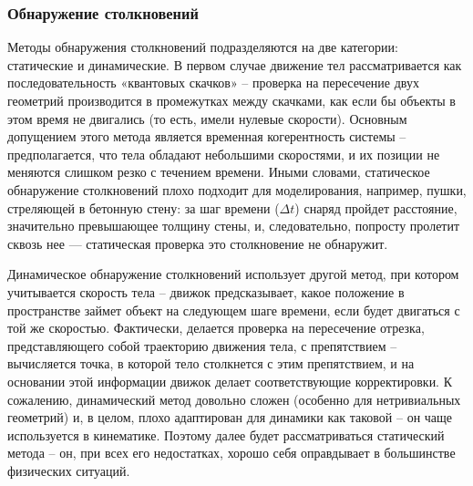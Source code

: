 \subsubsection{Обнаружение столкновений}
Методы обнаружения столкновений подразделяются на две категории: статические и динамические. В первом случае
движение тел рассматривается как последовательность «квантовых скачков» – проверка на пересечение двух геометрий
производится в промежутках между скачками, как если бы объекты в этом время не двигались (то есть, имели нулевые
скорости). Основным допущением этого метода является временная когерентность системы – предполагается, что тела
обладают небольшими скоростями, и их позиции не меняются слишком резко с течением времени. Иными словами,
статическое обнаружение столкновений плохо подходит для моделирования, например, пушки, стреляющей в бетонную
стену: за шаг времени ($\Delta{t}$) снаряд пройдет расстояние, значительно превышающее толщину стены, и, следовательно,
попросту пролетит сквозь нее --- статическая проверка это столкновение не обнаружит.

Динамическое обнаружение столкновений использует другой метод, при котором учитывается скорость тела – движок
предсказывает, какое положение в пространстве займет объект на следующем шаге времени, если будет двигаться с той же
скоростью. Фактически, делается проверка на пересечение отрезка, представляющего собой траекторию движения тела, с
препятствием – вычисляется точка, в которой тело столкнется с этим препятствием, и на основании этой информации движок
делает соответствующие корректировки. К сожалению, динамический метод довольно сложен (особенно для
нетривиальных геометрий) и, в целом, плохо адаптирован для динамики как таковой – он чаще используется в кинематике.
Поэтому далее будет рассматриваться статический метода – он, при всех его недостатках, хорошо себя оправдывает в
большинстве физических ситуаций.

